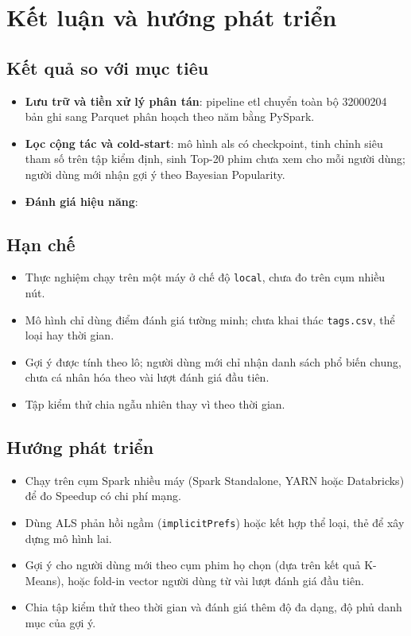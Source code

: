 \chapter{Kết luận và hướng phát triển}
\label{chap:ket_luan}

\section{Kết quả so với mục tiêu}
\label{sec:ket_qua}
\begin{itemize}
    \item \textbf{Lưu trữ và tiền xử lý phân tán}: pipeline \gls{etl} chuyển toàn bộ \num{32000204} bản ghi sang Parquet phân hoạch theo năm bằng PySpark. 
    \item \textbf{Lọc cộng tác và cold-start}: mô hình \gls{als} có checkpoint, tinh chỉnh siêu tham số trên tập kiểm định, sinh Top-20 phim chưa xem cho mỗi người dùng; người dùng mới nhận gợi ý theo Bayesian Popularity. 
    \item \textbf{Đánh giá hiệu năng}: 
\end{itemize}

\section{Hạn chế}
\label{sec:han_che}
\begin{itemize}
    \item Thực nghiệm chạy trên một máy ở chế độ \texttt{local}, chưa đo trên cụm nhiều nút.
    \item Mô hình chỉ dùng điểm đánh giá tường minh; chưa khai thác \texttt{tags.csv}, thể loại hay thời gian.
    \item Gợi ý được tính theo lô; người dùng mới chỉ nhận danh sách phổ biến chung, chưa cá nhân hóa theo vài lượt đánh giá đầu tiên.
    \item Tập kiểm thử chia ngẫu nhiên thay vì theo thời gian.
\end{itemize}

\section{Hướng phát triển}
\label{sec:huong_phat_trien}
\begin{itemize}
    \item Chạy trên cụm Spark nhiều máy (Spark Standalone, YARN hoặc Databricks) để đo Speedup có chi phí mạng.
    \item Dùng ALS phản hồi ngầm (\texttt{implicitPrefs}) hoặc kết hợp thể loại, thẻ để xây dựng mô hình lai.
    \item Gợi ý cho người dùng mới theo cụm phim họ chọn (dựa trên kết quả K-Means), hoặc fold-in vector người dùng từ vài lượt đánh giá đầu tiên.
    \item Chia tập kiểm thử theo thời gian và đánh giá thêm độ đa dạng, độ phủ danh mục của gợi ý.
\end{itemize}
